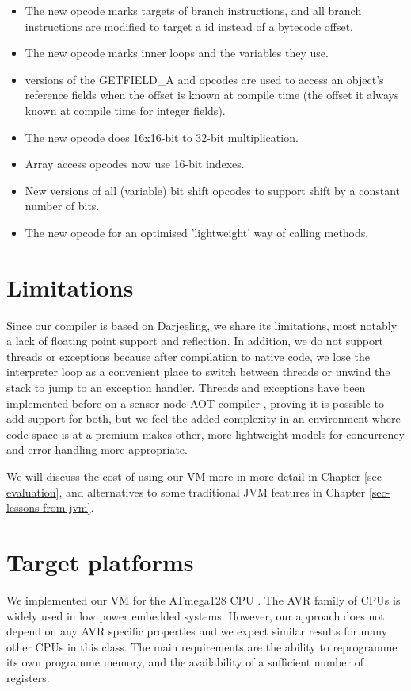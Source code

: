 \begin{itemize}
  \item The new  opcode marks targets of branch instructions, and all branch instructions are modified to target a  id instead of a bytecode offset.
  \item The new  opcode marks inner loops and the variables they use.
  \item {} versions of the {GETFIELD\_A} and  opcodes are used to access an object's reference fields when the offset is known at compile time (the offset it always known at compile time for integer fields).
  \item The new  opcode does 16x16-bit to 32-bit multiplication.
  \item Array access opcodes now use 16-bit indexes.
  \item New  versions of all (variable) bit shift opcodes to support shift by a constant number of bits.
  \item The new  opcode for an optimised 'lightweight' way of calling methods.
\end{itemize}


\section{Limitations}
Since our compiler is based on Darjeeling, we share its limitations, most notably a lack of floating point support and reflection. In addition, we do not support threads or exceptions because after compilation to native code, we lose the interpreter loop as a convenient place to switch between threads or unwind the stack to jump to an exception handler. Threads and exceptions have been implemented before on a sensor node AOT compiler \cite{Ellul:2012thesis}, proving it is possible to add support for both, but we feel the added complexity in an environment where code space is at a premium makes other, more lightweight models for concurrency and error handling more appropriate.

We will discuss the cost of using our VM more in more detail in Chapter \ref{sec-evaluation}, and alternatives to some traditional JVM features in Chapter \ref{sec-lessons-from-jvm}.


\section{Target platforms}
We implemented our VM for the ATmega128 CPU \cite{Atmel:ATMEGA128Datasheet}. The AVR family of CPUs is widely used in low power embedded systems. However, our approach does not depend on any AVR specific properties and we expect similar results for many other CPUs in this class. The main requirements are the ability to reprogramme its own programme memory, and the availability of a sufficient number of registers.

